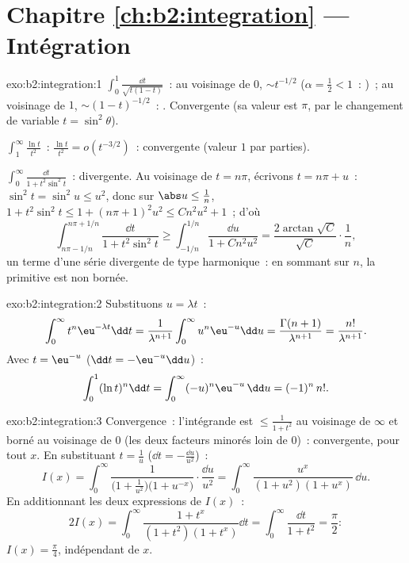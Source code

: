 \section*{Chapitre \ref{ch:b2:integration} --- Intégration}

\begin{solution}{exo:b2:integration:1}
$\int_0^1 \frac{\dd t}{\sqrt{t(1-t)}}$~: au voisinage de $0$, $\sim t^{-1/2}$
($\alpha = \frac12 < 1$~: )~; au voisinage de $1$, $\sim
(1-t)^{-1/2}$~: . Convergente (sa valeur est $\pi$, par le
changement de variable $t = \sin^2\theta$).

$\int_1^\infty \frac{\ln t}{t^2}$~: $\frac{\ln t}{t^2} = o(t^{-3/2})$~:
convergente (valeur $1$ par parties).

$\int_0^\infty \frac{\dd t}{1 + t^2\sin^2 t}$~: divergente. Au voisinage de $t =
n\pi$, écrivons $t = n\pi + u$~: $\sin^2 t = \sin^2 u \leq u^2$, donc sur
$\abs u \leq \frac{1}{n}$, $1 + t^2\sin^2 t \leq 1 + (n\pi +
1)^2u^2 \leq C n^2 u^2 + 1$~; d'où
\[
\int_{n\pi - 1/n}^{n\pi + 1/n} \frac{\dd t}{1 + t^2\sin^2 t}
\geq \int_{-1/n}^{1/n} \frac{\dd u}{1 + Cn^2u^2}
= \frac{2\arctan\sqrt C}{\sqrt C}\cdot\frac{1}{n} ,
\]
un terme d'une série divergente de type harmonique~: en sommant sur $n$, la
primitive est non bornée.
\end{solution}

\begin{solution}{exo:b2:integration:2}
Substituons $u = \lambda t$~:
\[
\int_0^\infty t^n \eu^{-\lambda t}\dd t
= \frac{1}{\lambda^{n+1}}\int_0^\infty u^n\eu^{-u}\dd u
= \frac{\Gamma(n+1)}{\lambda^{n+1}} = \frac{n!}{\lambda^{n+1}} .
\]
Avec $t = \eu^{-u}$ ($\dd t = -\eu^{-u}\dd u$)~:
\[
\int_0^1 (\ln t)^n \dd t = \int_0^{\infty} (-u)^n \eu^{-u}\,\dd u
= (-1)^n\, n! .
\]
\end{solution}

\begin{solution}{exo:b2:integration:3}
Convergence~: l'intégrande est $\leq \frac{1}{1+t^2}$ au voisinage de $\infty$
et borné au voisinage de $0$ (les deux facteurs minorés loin de $0$)~:
 convergente, pour tout $x$. En substituant $t = \frac1u$
($\dd t = -\frac{\dd u}{u^2}$)~:
\[
I(x) = \int_0^\infty \frac{1}{\bigl(1 +
\frac1{u^2}\bigr)\bigl(1 + u^{-x}\bigr)}\cdot\frac{\dd u}{u^2}
= \int_0^\infty \frac{u^x}{(1 + u^2)(1 + u^x)}\,\dd u .
\]
En additionnant les deux expressions de $I(x)$~:
\[
2I(x) = \int_0^\infty \frac{1 + t^x}{(1+t^2)(1+t^x)}\dd t
= \int_0^\infty \frac{\dd t}{1 + t^2} = \frac{\pi}{2} :
\]
$I(x) = \frac\pi4$, indépendant de $x$.
\end{solution}

